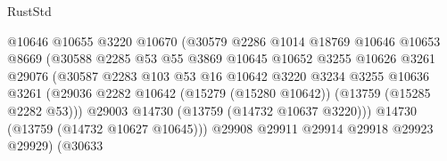 \begin{lexlean}{RustStd}
\begin{coremodule}
                                        @10646
                                        @10655
                                        @3220
                                        @10670
                                        (@30579
                                          @2286
                                          @1014
                                          @18769
                                          @10646
                                          @10653
                                          @8669
                                          (@30588
                                            @2285
                                            @53
                                            @55
                                            @3869
                                            @10645
                                            @10652
                                            @3255
                                            @10626
                                            @3261
                                            @29076
                                            (@30587
                                              @2283
                                              @103
                                              @53
                                              @16
                                              @10642
                                              @3220
                                              @3234
                                              @3255
                                              @10636
                                              @3261
                                              (@29036
                                                @2282
                                                @10642
                                                (@15279 (@15280 @10642))
                                                (@13759 (@15285 @2282 @53)))
                                              @29003
                                              @14730
                                              (@13759 (@14732 @10637 @3220)))
                                            @14730
                                            (@13759 (@14732 @10627 @10645)))
                                          @29908
                                          @29911
                                          @29914
                                          @29918
                                          @29923
                                          @29929)
                                        (@30633

\end{coremodule}
\end{lexlean}
